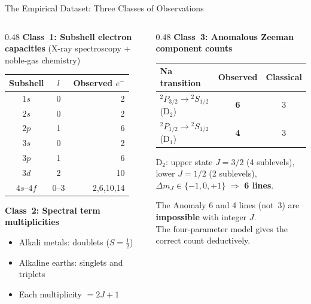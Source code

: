 \documentclass[aspectratio=169,12pt]{beamer}
\begin{document}
\begin{frame}[shrink=15]{The Empirical Dataset: Three Classes of Observations}

\begin{columns}[T]
\begin{column}{0.48\textwidth}
\textbf{Class~1: Subshell electron capacities}
(X-ray spectroscopy + noble-gas chemistry)

\medskip
\begin{tabular}{ccr}
\toprule
Subshell & $l$ & Observed $e^-$ \\
\midrule
$1s$ & 0 & 2 \\
$2s$ & 0 & 2 \\
$2p$ & 1 & 6 \\
$3s$ & 0 & 2 \\
$3p$ & 1 & 6 \\
$3d$ & 2 & 10 \\
$4s$--$4f$ & 0--3 & 2,6,10,14 \\
\bottomrule
\end{tabular}

\bigskip
\textbf{Class~2: Spectral term multiplicities}
\begin{itemize}
  \item Alkali metals: doublets ($S=\tfrac{1}{2}$)
  \item Alkaline earths: singlets and triplets
  \item Each multiplicity $= 2J+1$
\end{itemize}
\end{column}
\begin{column}{0.48\textwidth}
\textbf{Class~3: Anomalous Zeeman component counts}

\medskip
\begin{tabular}{p{3.4cm}cc}
\toprule
Na transition & Observed & Classical \\
\midrule
$^2P_{3/2}\to{}^2S_{1/2}$ (D$_2$) & \textbf{6} & 3 \\
$^2P_{1/2}\to{}^2S_{1/2}$ (D$_1$) & \textbf{4} & 3 \\
\bottomrule
\end{tabular}

\medskip
\small D$_2$: upper state $J=3/2$ (4 sublevels),
lower $J=1/2$ (2 sublevels),
$\Delta m_J \in \{-1,0,+1\}$ $\Rightarrow$ \textbf{6 lines}.

\bigskip
\begin{alertblock}{The Anomaly}
6 and 4 lines (not~3) are
\textbf{impossible} with integer $J$.\\
The four-parameter model gives the
correct count deductively.
\end{alertblock}
\end{column}
\end{columns}

\end{frame}
\end{document}
